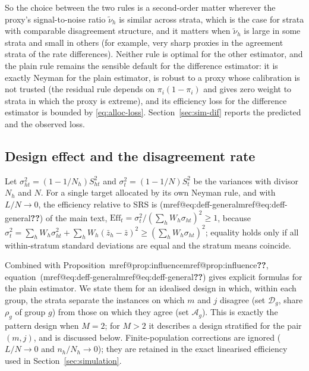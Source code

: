 \documentclass[pdflatex,sn-mathphys-num,iicol]{sn-jnl}
\makeatletter
\theoremstyle{thmstyleone}
\theoremstyle{thmstyletwo}
\theoremstyle{thmstylethree}
\newcommand{\Mref}[1]{\ifcsname mref@#1\endcsname\csname mref@#1\endcsname\else\textbf{??}\fi}
\makeatother
\begin{document}
So the choice between the two rules is a second-order matter wherever the proxy's signal-to-noise ratio $\tilde\nu_h$ is similar across strata, which is the case for strata with
comparable disagreement structure, and it matters when $\tilde\nu_h$ is large in some strata and small in others (for example, very sharp proxies in the agreement strata of the
rate differences). Neither rule is optimal for the other estimator, and the plain rule remains the sensible default for the difference estimator: it is exactly Neyman for the plain estimator, is
robust to a proxy whose calibration is not trusted (the residual rule depends on $\pi_i(1-\pi_i)$ and gives zero weight to strata in which the proxy is
extreme), and its efficiency loss for the difference estimator is bounded by \eqref{eq:alloc-loss}. Section~\ref{sec:sim-dif} reports the predicted and the observed loss.

\subsection{Design effect and the disagreement rate}\label{si:theory-deff}

Let $\sigma^2_{ht}=(1-1/N_h)S^2_{ht}$ and $\sigma^2_t=(1-1/N)S^2_t$ be the variances with divisor
$N_h$ and $N$. For a single target allocated by its own Neyman rule, and with $L/N\to0$,
the efficiency relative to SRS is (\Mref{eq:deff-general}) of the main text,
$\mathrm{Eff}_t=\sigma_t^2/(\sum_hW_h\sigma_{ht})^2\ge1$, because
$\sigma_t^2=\sum_hW_h\sigma_{ht}^2+\sum_hW_h(\bar z_h-\bar z)^2\ge(\sum_hW_h\sigma_{ht})^2$; equality
holds only if all within-stratum standard deviations are equal and the stratum means coincide.

Combined with Proposition~\Mref{prop:influence}, equation~(\Mref{eq:deff-general}) gives explicit formulas for the plain estimator.
We state them for an idealised design in which, within each group, the strata separate the
instances on which $m$ and $j$ disagree (set $\mathcal D_g$, share $\rho_g$ of group $g$) from
those on which they agree (set $\mathcal A_g$). This is exactly the pattern design when $M=2$; for
$M>2$ it describes a design stratified for the pair $(m,j)$, and is discussed below.
Finite-population corrections are ignored ($L/N\to0$ and $n_h/N_h\to0$); they are retained in
the exact linearised efficiency used in Section~\ref{sec:simulation}.
\end{document}
